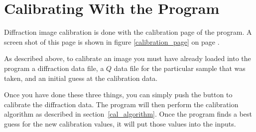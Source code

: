 \section{Calibrating With the Program}

Diffraction image calibration is done with the
calibration page of the program. A screen shot
of this page is shown in figure
\ref{calibration_page} on page
\pageref{calibration_page}.

As described above, to calibrate an image
you must have already loaded into the program
a diffraction data file, a $Q$ data 
file for the particular sample that was
taken, and an initial guess at the calibration 
data.

Once you have done these three things, you can
simply push the  button to
calibrate the diffraction data. The program will
then perform the calibration algorithm as described
in section~\ref{cal_algorithm}. Once the program
finds a best guess for the new calibration
values, it will put those values into the inputs. 

